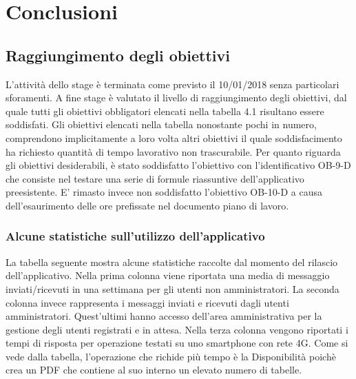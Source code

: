 
\chapter{Conclusioni}
\label{cap:conclusioni}




\section{Raggiungimento degli obiettivi}
L'attività dello stage è terminata come previsto il 10/01/2018 senza particolari sforamenti. 
A fine stage è valutato il livello di raggiungimento degli obiettivi, dal quale tutti gli obiettivi obbligatori elencati nella tabella
4.1 risultano essere soddisfati. Gli obiettivi elencati nella tabella nonostante pochi in numero, comprendono implicitamente a loro volta altri obiettivi il quale soddisfacimento ha richiesto quantità di tempo lavorativo non trascurabile. Per quanto riguarda gli obiettivi desiderabili, è stato soddisfatto l'obiettivo con l'identificativo OB-9-D che consiste nel testare una serie di formule riassuntive dell'applicativo preesistente. E' rimasto invece non soddisfatto l'obiettivo OB-10-D a causa
 dell'esaurimento delle ore prefissate nel documento piano di lavoro.


 
 

\subsection{Alcune statistiche sull'utilizzo dell'applicativo}

La tabella seguente mostra alcune statistiche raccolte dal momento del rilascio dell'applicativo. Nella prima colonna viene riportata una media di messaggio inviati/ricevuti in una settimana per gli utenti non amministratori. La seconda colonna invece rappresenta i messaggi inviati e ricevuti dagli utenti amministratori. Quest'ultimi hanno accesso dell'area amministrativa per la gestione degli utenti registrati e in attesa. Nella terza colonna vengono riportati i tempi di risposta per operazione testati su uno smartphone con rete 4G. Come si vede dalla tabella, l'operazione che richide più tempo è la Disponibilità poichè  crea un PDF che contiene al suo interno un elevato numero di tabelle.


